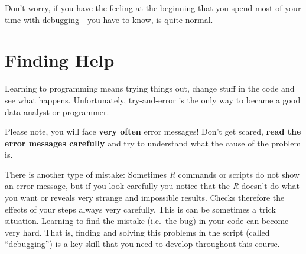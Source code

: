 \documentclass[
]{scrartcl}
\begin{document}
Don't worry, if you have the feeling at the beginning that you spend most of your time with debugging---you have to know, is quite normal.

\section{Finding Help}\label{findinghelp}

Learning to programming means trying things out, change stuff in the code and see what happens. Unfortunately, try-and-error is the only way to became a good data analyst or programmer.

Please note, you will face \textbf{very often} error messages! Don't get scared, \textbf{read the error messages carefully} and try to understand what the cause of the problem is.

There is another type of mistake: Sometimes \emph{R} commands or scripts do not show an error message, but if you look carefully you notice that the \emph{R} doesn't do what you want or reveals very strange and impossible results. Checks therefore the effects of your steps always very carefully. This is can be sometimes a trick situation. Learning to find the mistake (i.e.~the bug) in your code can become very hard. That is, finding and solving this problems in the script (called ``debugging'') is a key skill that you need to develop throughout this course.
\end{document}
